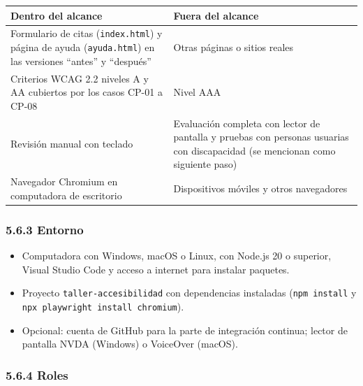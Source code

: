 \documentclass[10pt,letterpaper,onecolumn]{IEEEtran}
\newcommand{\filafina}{\arrayrulecolor{black!30}\specialrule{0.3pt}{1.5pt}{1.5pt}\arrayrulecolor{black}}
\begin{document}
\begin{longtable}[]{@{}
  >{\raggedright\arraybackslash}p{0.5278\dimexpr\linewidth-2\tabcolsep\relax}
  >{\raggedright\arraybackslash}p{0.4722\dimexpr\linewidth-2\tabcolsep\relax}@{}}
\toprule\noalign{}
\begin{minipage}[b]{\linewidth}\raggedright
Dentro del alcance
\end{minipage} & \begin{minipage}[b]{\linewidth}\raggedright
Fuera del alcance
\end{minipage} \\
\midrule\noalign{}
\endhead
\bottomrule\noalign{}
\endlastfoot
Formulario de citas (\texttt{index.\allowbreak{}\allowbreak{}html}) y página de ayuda (\texttt{ayuda.\allowbreak{}\allowbreak{}html}) en las versiones ``antes'' y ``después'' & Otras páginas o sitios reales \\ \filafina
Criterios WCAG 2.2 niveles A y AA cubiertos por los casos CP-01 a CP-08 & Nivel AAA \\ \filafina
Revisión manual con teclado & Evaluación completa con lector de pantalla y pruebas con personas usuarias con discapacidad (se mencionan como siguiente paso) \\ \filafina
Navegador Chromium en computadora de escritorio & Dispositivos móviles y otros navegadores \\
\end{longtable}

\subsubsection{5.6.3 Entorno}\label{entorno}

\begin{itemize}
\item
  Computadora con Windows, macOS o Linux, con Node.js 20 o superior, Visual Studio Code y acceso a internet para instalar paquetes.
\item
  Proyecto \texttt{taller-\allowbreak{}\allowbreak{}accesibilidad} con dependencias instaladas (\texttt{npm install} y \texttt{npx playwright install chromium}).
\item
  Opcional: cuenta de GitHub para la parte de integración continua; lector de pantalla NVDA (Windows) o VoiceOver (macOS).
\end{itemize}

\subsubsection{5.6.4 Roles}\label{roles}
\end{document}
